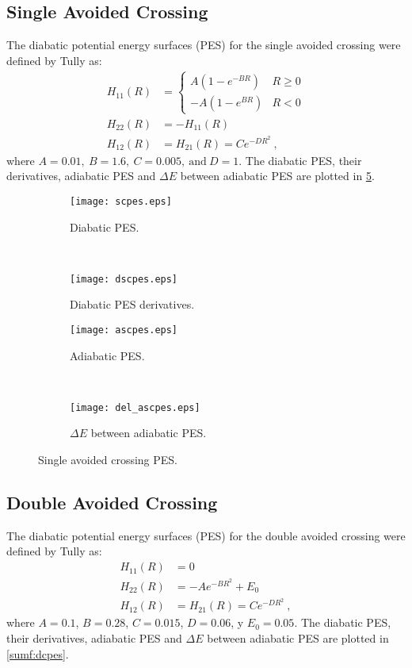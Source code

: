 \subsection*{Single Avoided Crossing}
%
The diabatic potential energy surfaces (PES) for the single avoided crossing 
were defined by Tully \cite{tully} as:
\begin{subequations}
\begin{align}\label{e:scpes}
H_{11}(R) &=
\begin{cases}
A \left(1 - e^{-B R}\right) & R\geq 0\\
-A \left(1 - e^{B R}\right) & R<0
\end{cases}\\
H_{22}(R) &= -H_{11}(R)\\
H_{12}(R) &= H_{21}(R) = C e^{-D R^{2}}~,
\end{align}
\end{subequations}
where $ A = 0.01,~B = 1.6,~C = 0.005,~\text{and}~D = 1$. The diabatic PES, their derivatives, adiabatic PES and $ \Delta E $ between adiabatic PES are plotted in \cref{sumf:scpes}.

\begin{figure}
\centering
\begin{subfigure}[t]{0.485\textwidth}
\centering
\texttt{[image: scpes.eps]}
\caption[]{Diabatic PES.}
\label{sumf:pessc}
\end{subfigure}
~
\begin{subfigure}[t]{0.485\textwidth}
\centering
\texttt{[image: dscpes.eps]}
\caption[]{Diabatic PES derivatives.}
\label{sumf:dpessc}
\end{subfigure}

\begin{subfigure}[t]{0.485\textwidth}
\centering
\texttt{[image: ascpes.eps]}
\caption[]{Adiabatic PES.}
\label{sumf:apessc}
\end{subfigure}
~
\begin{subfigure}[t]{0.485\textwidth}
\centering
\texttt{[image: del\_ascpes.eps]}
\caption[]{$ \Delta E$ between adiabatic PES.}
\label{sumf:delapessc}
\end{subfigure}
\caption[]{Single avoided crossing PES.}\label{sumf:scpes}
\end{figure}
%
\subsection*{Double Avoided Crossing}
%
The diabatic potential energy surfaces (PES) for the double avoided crossing 
were defined by Tully \cite{tully} as:
\begin{subequations}
\begin{align}
H_{11}(R) &= 0 \\
H_{22}(R) &= -A e^{-B R^{2}} + E_{0}\\
H_{12}(R) &= H_{21}(R) = C e^{-D R^{2}}~,
\end{align}
\end{subequations}
where $ A = 0.1$, $B = 0.28$, $C = 0.015$, $D = 0.06$, y $E_{0} = 0.05$. The diabatic PES, their derivatives, adiabatic PES and $ \Delta E $ between adiabatic PES are plotted in \cref{sumf:dcpes}.

